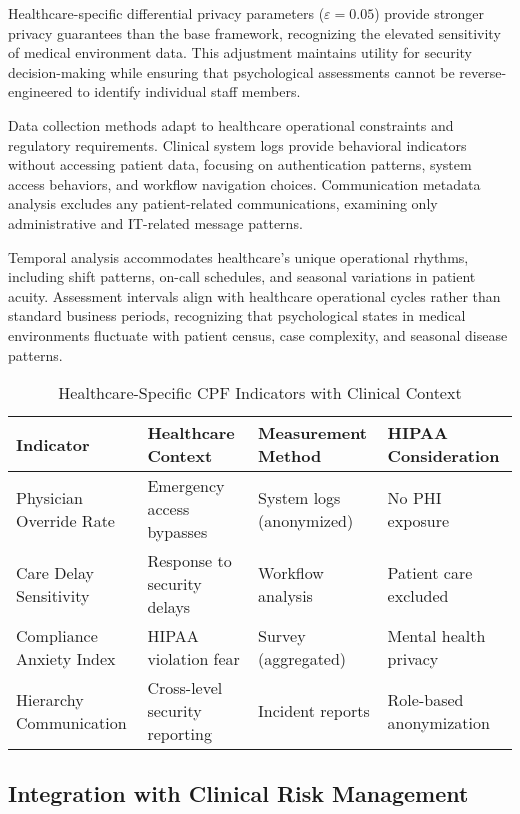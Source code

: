 \documentclass[10pt, twocolumn]{article}
\begin{document}
Healthcare-specific differential privacy parameters ($\varepsilon = 0.05$) provide stronger privacy guarantees than the base framework, recognizing the elevated sensitivity of medical environment data. This adjustment maintains utility for security decision-making while ensuring that psychological assessments cannot be reverse-engineered to identify individual staff members.

Data collection methods adapt to healthcare operational constraints and regulatory requirements. Clinical system logs provide behavioral indicators without accessing patient data, focusing on authentication patterns, system access behaviors, and workflow navigation choices. Communication metadata analysis excludes any patient-related communications, examining only administrative and IT-related message patterns.

Temporal analysis accommodates healthcare's unique operational rhythms, including shift patterns, on-call schedules, and seasonal variations in patient acuity. Assessment intervals align with healthcare operational cycles rather than standard business periods, recognizing that psychological states in medical environments fluctuate with patient census, case complexity, and seasonal disease patterns.

\begin{table*}[t]
\caption{Healthcare-Specific CPF Indicators with Clinical Context}
\label{tab:healthcare_indicators}
\centering
\begin{tabular}{@{}l l l l@{}}
\toprule
\textbf{Indicator} & \textbf{Healthcare Context} & \textbf{Measurement Method} & \textbf{HIPAA Consideration} \\
\midrule
Physician Override Rate & Emergency access bypasses & System logs (anonymized) & No PHI exposure \\
\midrule
Care Delay Sensitivity & Response to security delays & Workflow analysis & Patient care excluded \\
\midrule
Compliance Anxiety Index & HIPAA violation fear & Survey (aggregated) & Mental health privacy \\
\midrule
Hierarchy Communication & Cross-level security reporting & Incident reports & Role-based anonymization \\
\bottomrule
\end{tabular}
\end{table*}

\subsection{Integration with Clinical Risk Management}
\end{document}
